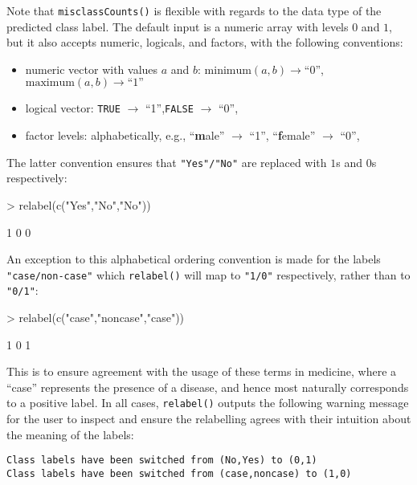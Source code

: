 \documentclass{article}
\begin{document}
Note that \verb+misclassCounts()+ is flexible with regards to the data type of the predicted class label. The default input is a numeric array with levels $0$ and $1$, but it also accepts numeric, logicals, and factors, with the following conventions:
\begin{itemize}
\item numeric vector with values $a$ and $b$: $\text{minimum}(a,b) \rightarrow \text{``0''}$, $\text{maximum}(a,b) \rightarrow \text{``1''}$
\item logical vector: \verb+TRUE+ $\rightarrow$ ``1'',\verb+FALSE+ $\rightarrow$ ``0'',
\item factor levels: alphabetically, e.g., ``\textbf{m}ale'' $\rightarrow$ ``1'', ``\textbf{f}emale'' $\rightarrow$ ``0'', 
\end{itemize}
The latter convention ensures that  \verb+"Yes"/"No"+ are replaced with $1$s and $0$s respectively: 
\begin{Schunk}
\begin{Sinput}
> relabel(c("Yes","No","No"))
\end{Sinput}
\begin{Soutput}
[1] 1 0 0
\end{Soutput}
\end{Schunk}
An exception to this alphabetical ordering convention is made for the labels \verb+"case/non-case"+ which \verb+relabel()+ will map to \verb+"1/0"+ respectively, rather than to \verb+"0/1"+:
\begin{Schunk}
\begin{Sinput}
> relabel(c("case","noncase","case"))
\end{Sinput}
\begin{Soutput}
[1] 1 0 1
\end{Soutput}
\end{Schunk}
This is to ensure agreement with the usage of these terms in medicine, where a ``case'' represents the presence of a disease, and hence most naturally corresponds to a positive label. In all cases, \verb+relabel()+ outputs the following warning message for the user to inspect and ensure the relabelling agrees with their intuition about the meaning of the labels:
\begin{verbatim}
Class labels have been switched from (No,Yes) to (0,1)
Class labels have been switched from (case,noncase) to (1,0)
\end{verbatim}
\end{document}
